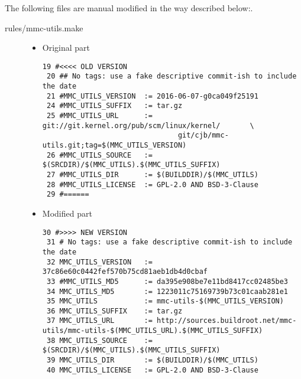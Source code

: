 The following files are manual modified in the way described below:.

\begin{description}
    \item[rules/mmc-utils.make]
        \begin{itemize}
            \item Original part
                \begin{lstlisting}[caption={rules/mmc-utils}]
 19 #<<<< OLD VERSION
 20 ## No tags: use a fake descriptive commit-ish to include the date
 21 #MMC_UTILS_VERSION  := 2016-06-07-g0ca049f25191
 24 #MMC_UTILS_SUFFIX   := tar.gz
 25 #MMC_UTILS_URL      := git://git.kernel.org/pub/scm/linux/kernel/   	\
								git/cjb/mmc-utils.git;tag=$(MMC_UTILS_VERSION)
 26 #MMC_UTILS_SOURCE   := $(SRCDIR)/$(MMC_UTILS).$(MMC_UTILS_SUFFIX)
 27 #MMC_UTILS_DIR      := $(BUILDDIR)/$(MMC_UTILS)
 28 #MMC_UTILS_LICENSE  := GPL-2.0 AND BSD-3-Clause
 29 #======
                \end{lstlisting}
            \item Modified part

                \begin{lstlisting}[caption={rules/mmc-utils}]
30 #>>>> NEW VERSION
 31 # No tags: use a fake descriptive commit-ish to include the date
 32 MMC_UTILS_VERSION   := 37c86e60c0442fef570b75cd81aeb1db4d0cbaf
 33 #MMC_UTILS_MD5      := da395e908be7e11bd8417cc02485be3
 34 MMC_UTILS_MD5       := 1223011c75169739b73c01caab281e1
 35 MMC_UTILS           := mmc-utils-$(MMC_UTILS_VERSION)
 36 MMC_UTILS_SUFFIX    := tar.gz
 37 MMC_UTILS_URL       := http://sources.buildroot.net/mmc-utils/mmc-utils-$(MMC_UTILS_URL).$(MMC_UTILS_SUFFIX)
 38 MMC_UTILS_SOURCE    := $(SRCDIR)/$(MMC_UTILS).$(MMC_UTILS_SUFFIX)
 39 MMC_UTILS_DIR       := $(BUILDDIR)/$(MMC_UTILS)
 40 MMC_UTILS_LICENSE   := GPL-2.0 AND BSD-3-Clause
                \end{lstlisting}

        \end{itemize}
\end{description}

